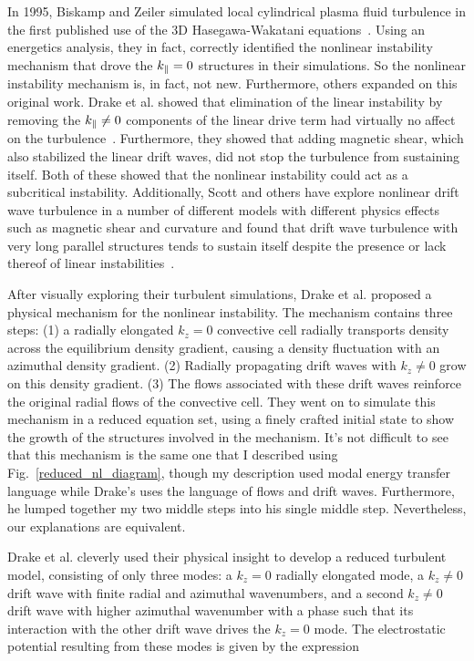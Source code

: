 In 1995, Biskamp and Zeiler simulated local cylindrical plasma fluid turbulence in the first published use of the 3D Hasegawa-Wakatani equations~\cite{biskamp1995}. 
Using an energetics analysis, they in fact, correctly identified the nonlinear instability mechanism that drove the $k_\parallel=0$ structures in their simulations. So the nonlinear instability
mechanism is, in fact, not new. Furthermore, others expanded on this original work. 
Drake et al. showed that elimination of the linear instability by removing the $k_\parallel \ne 0$ components of the linear drive term
had virtually no affect on the turbulence~\cite{drake1995}. Furthermore, they showed that adding magnetic shear, which also stabilized the linear drift waves, did not stop the turbulence
from sustaining itself. Both of these showed that the nonlinear instability could act as a subcritical instability.
Additionally, Scott and others have explore nonlinear drift wave turbulence in a number of different models with different physics effects such as magnetic shear and curvature
and found that drift wave turbulence with very long parallel structures tends to sustain itself despite the presence or lack thereof of linear 
instabilities~\cite{scott1990,scott1992,zeiler1996,zeiler1997,korsholm1999,scott2002,scott2003,scott2005}.

After visually exploring their turbulent simulations, Drake et al. proposed a physical mechanism for the nonlinear instability. The mechanism contains three steps: (1) a radially elongated $k_z = 0$
convective cell radially transports density across the equilibrium density gradient, causing a density fluctuation with an azimuthal density gradient. (2) Radially propagating 
drift waves with $k_z \ne 0$ grow on this density gradient. (3) The flows associated with these drift waves reinforce the original radial flows of the convective cell. They went on to simulate
this mechanism in a reduced equation set, using a finely crafted initial state to show the growth of the structures involved in the mechanism. It's not difficult to see that this mechanism
is the same one that I described using Fig.~\ref{reduced_nl_diagram}, though my description used modal energy transfer language while Drake's uses the language of flows and drift waves.
Furthermore, he lumped together my two middle steps into his single middle step. Nevertheless, our explanations are equivalent.

Drake et al. cleverly used their physical insight to develop a reduced turbulent model, consisting of only three modes: a $k_z = 0$ radially elongated mode, a $k_z \ne 0$ drift wave with finite
radial and azimuthal wavenumbers, and a second $k_z \ne 0$ drift wave with higher azimuthal wavenumber with a phase such that its interaction with the other drift wave drives the $k_z = 0$
mode. The electrostatic potential resulting from these modes is given by the expression

